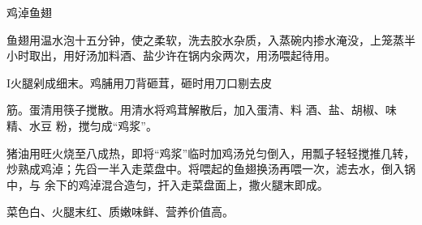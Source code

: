 \begin{recipe}{鸡淖鱼翅}

\ingredients


\preparation

\step 鱼翅用温水泡十五分钟，使之柔软，洗去胶水杂质，入蒸碗内掺水淹没，上笼蒸半
小时取出，用好汤加料酒、盐少许在锅内汆两次，用汤喂起待用。

I火腿剁成细末。鸡脯用刀背砸茸，砸时用刀口剔去皮

筋。蛋清用筷子搅散。用清水将鸡茸解散后，加入蛋清、料 酒、盐、胡椒、味精、水豆
粉，搅匀成“鸡浆”。

\step 猪油用旺火烧至八成热，即将“鸡浆”临时加鸡汤兑匀倒入，用瓢子轻轻搅推几转，
炒熟成鸡淖；先舀一半入走菜盘中。将喂起的鱼翅换汤再喂一次，滤去水，倒入锅中，与
余下的鸡淖混合造匀，扞入走菜盘面上，撒火腿末即成。

\features

菜色白、火腿末红、质嫩味鲜、营养价值高。

\end{recipe}

